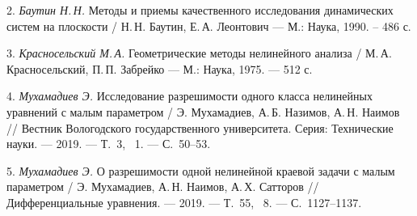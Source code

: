 2. {\it Баутин Н.\,Н. }
Методы и приемы качественного исследования динамических систем на
плоскости / Н.\,Н. Баутин, Е.\,А. Леонтович --- М.: Наука, 1990.
-- 486 с.

3. {\it Красносельский М.\,А. }
Геометрические методы нелинейного анализа / М.\,А. Красносельский,
П.\,П. Забрейко --- М.: Наука, 1975. --- 512 с.

4. {\it Мухамадиев Э. }
Исследование разрешимости одного класса нелинейных уравнений с
малым параметром  / Э. Мухамадиев, А.\,Б. Назимов, А.\,Н. Наимов
// Вестник Вологодского государственного университета. Серия:
Технические науки. --- 2019. --- Т.~3, \No~1. --- С.~50--53.

5. {\it Мухамадиев Э. }
О разрешимости одной нелинейной краевой задачи с малым параметром
/ Э. Мухамадиев, А.\,Н. Наимов, А.\,Х. Сатторов
// Дифференциальные уравнения. --- 2019. --- Т.~55, \No~8. --- С.~1127--1137.
